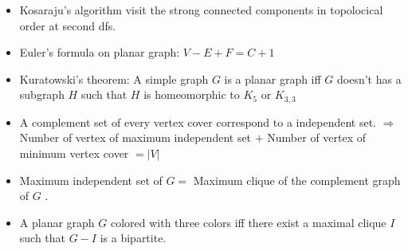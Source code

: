 \begin{itemize}

\item Kosaraju's algorithm visit the strong connected components in topolocical order at second dfs.

\item Euler's formula on planar graph:  $V - E + F = C + 1$

\item Kuratowski's theorem: A simple graph $G$ is a planar graph iff $G$ doesn't has a subgraph $H$ such that $H$ is homeomorphic to $K_5$ or $K_{3,3}$

\item A complement set of every vertex cover correspond to a independent set. $\Rightarrow$ Number of vertex of maximum independent set $+$ Number of vertex of minimum vertex cover $= \lvert V \rvert$

\item Maximum independent set of $G =$ Maximum clique of the complement graph of $G$ . 

\item A planar graph $G$ colored with three colors iff there exist a maximal clique $I$ such that $G - I$ is a bipartite. 

\end{itemize}
